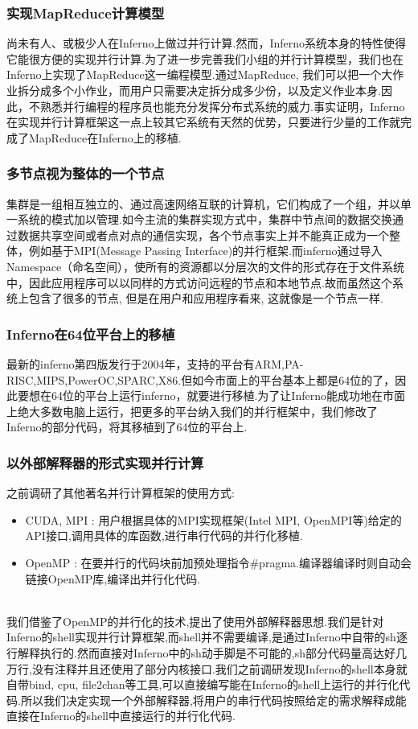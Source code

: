 \documentclass[paper=a4]{ctexart} %
\numberwithin{equation}{section} %
\numberwithin{figure}{section} %
\numberwithin{table}{section} %
\newcommand{\n}{\\\indent}
\begin{document}
\subsubsection{实现MapReduce计算模型}
尚未有人、或极少人在Inferno上做过并行计算.然而，Inferno系统本身的特性使得它能很方便的实现并行计算.为了进一步完善我们小组的并行计算模型，我们也在Inferno上实现了MapReduce这一编程模型.通过MapReduce, 我们可以把一个大作业拆分成多个小作业，而用户只需要决定拆分成多少份，以及定义作业本身.因此，不熟悉并行编程的程序员也能充分发挥分布式系统的威力.事实证明，Inferno在实现并行计算框架这一点上较其它系统有天然的优势，只要进行少量的工作就完成了MapReduce在Inferno上的移植.

\subsubsection{多节点视为整体的一个节点}
集群是一组相互独立的、通过高速网络互联的计算机，它们构成了一个组，并以单一系统的模式加以管理.如今主流的集群实现方式中，集群中节点间的数据交换通过数据共享空间或者点对点的通信实现，各个节点事实上并不能真正成为一个整体，例如基于MPI(Message Passing Interface)的并行框架.而inferno通过导入Namespace（命名空间），使所有的资源都以分层次的文件的形式存在于文件系统中，因此应用程序可以以同样的方式访问远程的节点和本地节点.故而虽然这个系统上包含了很多的节点, 但是在用户和应用程序看来, 这就像是一个节点一样. 

\subsubsection{Inferno在64位平台上的移植}
最新的inferno第四版发行于2004年，支持的平台有ARM,PA-RISC,MIPS,PowerOC,SPARC,X86.但如今市面上的平台基本上都是64位的了，因此要想在64位的平台上运行inferno，就要进行移植.为了让Inferno能成功地在市面上绝大多数电脑上运行，把更多的平台纳入我们的并行框架中，我们修改了Inferno的部分代码，将其移植到了64位的平台上.

\subsubsection{以外部解释器的形式实现并行计算}
之前调研了其他著名并行计算框架的使用方式:
\begin{itemize}
\item CUDA, MPI : 用户根据具体的MPI实现框架(Intel MPI, OpenMPI等)给定的API接口,调用具体的库函数,进行串行代码的并行化移植.
\item OpenMP : 在要并行的代码块前加预处理指令\#pragma.编译器编译时则自动会链接OpenMP库,编译出并行化代码.
\end{itemize} 
~\n
我们借鉴了OpenMP的并行化的技术,提出了使用外部解释器思想.我们是针对Inferno的shell实现并行计算框架,而shell并不需要编译,是通过Inferno中自带的sh逐行解释执行的.然而直接对Inferno中的sh动手脚是不可能的,sh部分代码量高达好几万行,没有注释并且还使用了部分内核接口.我们之前调研发现Inferno的shell本身就自带bind, cpu, file2chan等工具,可以直接编写能在Inferno的shell上运行的并行化代码.所以我们决定实现一个外部解释器,将用户的串行代码按照给定的需求解释成能直接在Inferno的shell中直接运行的并行化代码.\n
\end{document}

